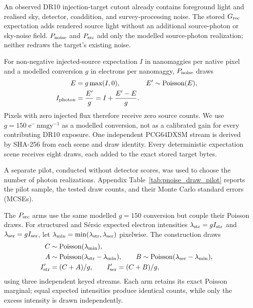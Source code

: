 An observed DR10 injection-target cutout already contains foreground light and
realised sky, detector, coaddition, and survey-processing noise. The stored
\(G_{\rm rec}\) expectation adds rendered source light without an additional
source-photon or sky-noise field. \(P_{\rm noise}\) and \(P_{\rm src}\) add
only the modelled source-photon realization; neither redraws the target's
existing noise.

For non-negative injected-source expectation \(I\) in nanomaggies per native
pixel and a modelled conversion \(g\) in electrons per nanomaggy,
\(P_{\rm noise}\) draws
\begin{equation}
\begin{aligned}
 E&=g\max(I,0),&
 E'&\sim\operatorname{Poisson}(E),\\
 I_{\rm photon}&=\frac{E'}{g}
 =I+\frac{E'-E}{g}.
\end{aligned}
\label{eq:poisson_arc_noise}
\end{equation}
Pixels with zero injected flux therefore receive zero source counts. We use
\(g=150\;\mathrm{e^{-}\,nmgy^{-1}}\) as a modelled conversion, not as a
calibrated gain for every contributing DR10 exposure. One independent
PCG64DXSM stream is derived by SHA-256 from each scene and draw identity.
Every deterministic expectation scene receives eight draws, each added to the
exact stored target bytes.

A separate pilot, conducted without detector scores, was used to choose the
number of photon realizations. Appendix
Table~\ref{tab:pnoise_draw_pilot} reports the pilot sample, the tested draw
counts, and their Monte Carlo standard errors (MCSEs).

The \(P_{\rm src}\) arms use the same modelled \(g=150\) conversion but couple
their Poisson draws. For structured and S\'{e}rsic expected electron
intensities \(\lambda_{\rm str}=gI_{\rm str}\) and
\(\lambda_{\rm ser}=gI_{\rm ser}\), let
\(\lambda_{\rm min}=\min(\lambda_{\rm str},\lambda_{\rm ser})\) pixelwise.
The construction draws
\begin{equation}
\begin{aligned}
 C&\sim{\rm Poisson}(\lambda_{\rm min}),\\
 A&\sim{\rm Poisson}(\lambda_{\rm str}-\lambda_{\rm min}),\qquad
 B\sim{\rm Poisson}(\lambda_{\rm ser}-\lambda_{\rm min}),\\
 I'_{\rm str}&=(C+A)/g,\qquad I'_{\rm ser}=(C+B)/g ,
\end{aligned}
\label{eq:coupled_source_photons}
\end{equation}
using three independent keyed streams. Each arm retains its exact Poisson
marginal; equal expected intensities produce identical counts, while only the
excess intensity is drawn independently.

